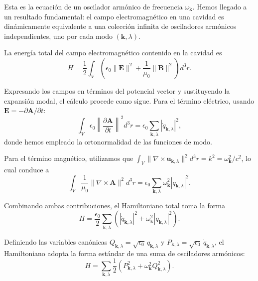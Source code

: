         Esta es la ecuación de un oscilador armónico de frecuencia $\omega_{\mathbf{k}}$. Hemos llegado a un resultado fundamental: el campo electromagnético en una cavidad es dinámicamente equivalente a una colección infinita de osciladores armónicos independientes, uno por cada modo $(\mathbf{k}, \lambda)$.

        La energía total del campo electromagnético contenido en la cavidad es \cite{Jackson1999}
        \begin{equation}
            H = \frac{1}{2}\int_V \left(\epsilon_0 \|\mathbf{E}\|^2 + \frac{1}{\mu_0}\|\mathbf{B}\|^2\right) d^3r.
        \end{equation}
        
        Expresando los campos en términos del potencial vector y sustituyendo la expansión modal, el cálculo procede como sigue. Para el término eléctrico, usando $\mathbf{E} = -\partial\mathbf{A}/\partial t$:
        \begin{equation}
            \int_V \epsilon_0 \left\|\frac{\partial \mathbf{A}}{\partial t}\right\|^2 d^3r = \epsilon_0 \sum_{\mathbf{k},\lambda} |\dot{q}_{\mathbf{k},\lambda}|^2,
        \end{equation}
        donde hemos empleado la ortonormalidad de las funciones de modo.
        
        Para el término magnético, utilizamos que $\int_V \|\nabla \times \mathbf{u}_{\mathbf{k},\lambda}\|^2 d^3r = k^2 = \omega_{\mathbf{k}}^2/c^2$, lo cual conduce a
        \begin{equation}
            \int_V \frac{1}{\mu_0}\|\nabla \times \mathbf{A}\|^2 d^3r = \epsilon_0 \sum_{\mathbf{k},\lambda} \omega_{\mathbf{k}}^2 |q_{\mathbf{k},\lambda}|^2.
        \end{equation}
        
        Combinando ambas contribuciones, el Hamiltoniano total toma la forma
        \begin{equation}
            H = \frac{\epsilon_0}{2} \sum_{\mathbf{k},\lambda} \left(|\dot{q}_{\mathbf{k},\lambda}|^2 + \omega_{\mathbf{k}}^2 |q_{\mathbf{k},\lambda}|^2\right).
        \end{equation}
        
        Definiendo las variables canónicas $Q_{\mathbf{k},\lambda} = \sqrt{\epsilon_0} \, q_{\mathbf{k},\lambda}$ y $P_{\mathbf{k},\lambda} = \sqrt{\epsilon_0} \, \dot{q}_{\mathbf{k},\lambda}$, el Hamiltoniano adopta la forma estándar de una suma de osciladores armónicos:
        \begin{equation}
            H = \sum_{\mathbf{k},\lambda} \frac{1}{2}\left(P_{\mathbf{k},\lambda}^2 + \omega_{\mathbf{k}}^2 Q_{\mathbf{k},\lambda}^2\right).
        \end{equation}

